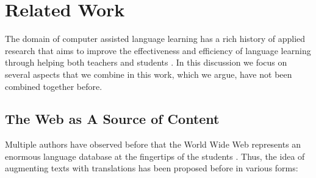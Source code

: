 \section{Related Work}

The domain of computer assisted language learning has a rich history of applied research that aims to improve the effectiveness and efficiency of language learning through helping both teachers and students \cite{levy2013call}. In this discussion we focus on several aspects that we combine in this work, which we argue, have not been combined together before.


\subsection{The Web as A Source of Content}

Multiple authors have observed before that the World Wide Web represents an enormous language database at the fingertips of the students \cite{Fried08-Learner,Hira07-WebCorpora}. 
Thus, the idea of augmenting texts with translations has been proposed before in various forms: 

